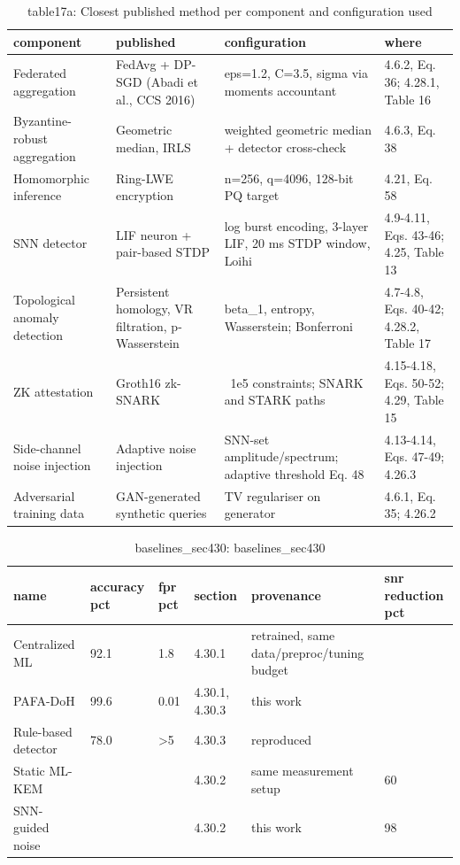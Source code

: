\begin{table}[ht]
\centering
\small
\caption{table17a: Closest published method per component and configuration used}
\label{tab:v2:table17a}
\begin{tabular}{llll}
\toprule
component & published & configuration & where \\
\midrule
Federated aggregation & FedAvg + DP-SGD (Abadi et al., CCS 2016) & eps=1.2, C=3.5, sigma via moments accountant & 4.6.2, Eq. 36; 4.28.1, Table 16 \\
Byzantine-robust aggregation & Geometric median, IRLS & weighted geometric median + detector cross-check & 4.6.3, Eq. 38 \\
Homomorphic inference & Ring-LWE encryption & n=256, q=4096, 128-bit PQ target & 4.21, Eq. 58 \\
SNN detector & LIF neuron + pair-based STDP & log burst encoding, 3-layer LIF, 20 ms STDP window, Loihi & 4.9-4.11, Eqs. 43-46; 4.25, Table 13 \\
Topological anomaly detection & Persistent homology, VR filtration, p-Wasserstein & beta\_1, entropy, Wasserstein; Bonferroni & 4.7-4.8, Eqs. 40-42; 4.28.2, Table 17 \\
ZK attestation & Groth16 zk-SNARK & ~1e5 constraints; SNARK and STARK paths & 4.15-4.18, Eqs. 50-52; 4.29, Table 15 \\
Side-channel noise injection & Adaptive noise injection & SNN-set amplitude/spectrum; adaptive threshold Eq. 48 & 4.13-4.14, Eqs. 47-49; 4.26.3 \\
Adversarial training data & GAN-generated synthetic queries & TV regulariser on generator & 4.6.1, Eq. 35; 4.26.2 \\
\bottomrule
\end{tabular}
\end{table}

\begin{table}[ht]
\centering
\small
\caption{baselines\_sec430: baselines\_sec430}
\label{tab:v2:baselines_sec430}
\begin{tabular}{llllll}
\toprule
name & accuracy pct & fpr pct & section & provenance & snr reduction pct \\
\midrule
Centralized ML & 92.1 & 1.8 & 4.30.1 & retrained, same data/preproc/tuning budget &  \\
PAFA-DoH & 99.6 & 0.01 & 4.30.1, 4.30.3 & this work &  \\
Rule-based detector & 78.0 & >5 & 4.30.3 & reproduced &  \\
Static ML-KEM &  &  & 4.30.2 & same measurement setup & 60 \\
SNN-guided noise &  &  & 4.30.2 & this work & 98 \\
\bottomrule
\end{tabular}
\end{table}
